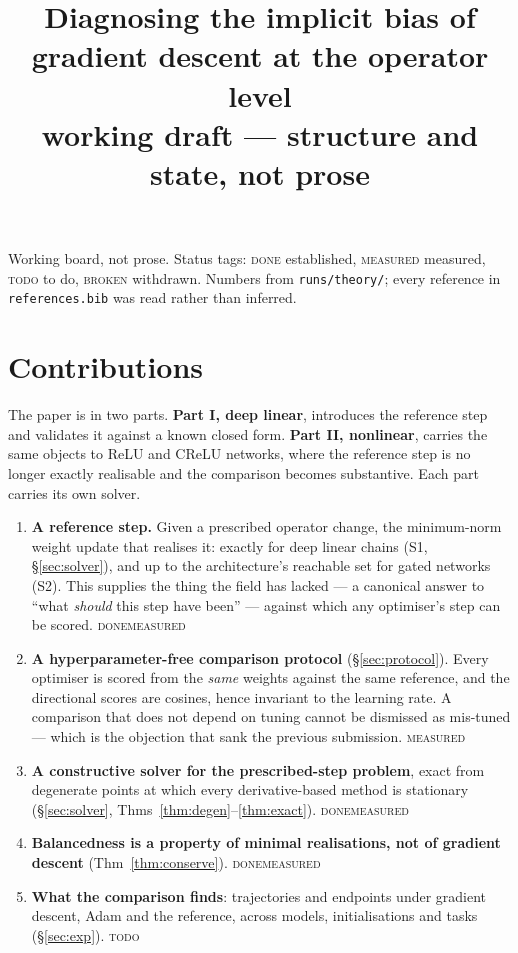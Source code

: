 \documentclass{article}
\title{Diagnosing the implicit bias of gradient descent at the operator level\\{\large working draft --- structure and state, not prose}}
\author{}\date{}
\newcommand{\OK}{{\color{green!50!black}\textsc{done}}}
\newcommand{\RUN}{{\color{blue!70!black}\textsc{measured}}}
\newcommand{\TD}{{\color{orange!85!black}\textsc{todo}}}
\newcommand{\NO}{{\color{red!75!black}\textsc{broken}}}
\newcommand{\NOTE}[1]{{\color{gray}\small #1}}
\theoremstyle{plain}\newtheorem{theorem}{Theorem}\newtheorem{lemma}[theorem]{Lemma}
\theoremstyle{definition}\newtheorem{definition}[theorem]{Definition}
\begin{document}
\maketitle



\NOTE{Working board, not prose. Status tags: \OK{} established, \RUN{} measured, \TD{} to do,
\NO{} withdrawn. Numbers from \texttt{runs/theory/}; every reference in \texttt{references.bib}
was read rather than inferred.}

\section{Contributions}\label{sec:contrib}

\NOTE{The paper is in two parts. \textbf{Part I, deep linear}, introduces the reference step and
validates it against a known closed form. \textbf{Part II, nonlinear}, carries the same objects to
ReLU and CReLU networks, where the reference step is no longer exactly realisable and the
comparison becomes substantive. Each part carries its own solver.}

\begin{enumerate}[label=\textbf{C\arabic*.},leftmargin=*,itemsep=2pt]
  \item \textbf{A reference step.} Given a prescribed operator change, the minimum-norm weight
        update that realises it: exactly for deep linear chains (S1, \S\ref{sec:solver}), and up to
        the architecture's reachable set for gated networks (S2). This supplies the thing the field
        has lacked --- a canonical answer to ``what \emph{should} this step have been'' --- against
        which any optimiser's step can be scored. \OK{}\RUN{}
  \item \textbf{A hyperparameter-free comparison protocol} (\S\ref{sec:protocol}). Every optimiser
        is scored from the \emph{same} weights against the same reference, and the directional
        scores are cosines, hence invariant to the learning rate. A comparison that does not depend
        on tuning cannot be dismissed as mis-tuned --- which is the objection that sank the previous
        submission. \RUN{}
  \item \textbf{A constructive solver for the prescribed-step problem}, exact from degenerate
        points at which every derivative-based method is stationary (\S\ref{sec:solver},
        Thms~\ref{thm:degen}--\ref{thm:exact}). \OK{}\RUN{}
  \item \textbf{Balancedness is a property of minimal realisations, not of gradient descent}
        (Thm~\ref{thm:conserve}). \OK{}\RUN{}
  \item \textbf{What the comparison finds}: trajectories and endpoints under gradient descent,
        Adam and the reference, across models, initialisations and tasks (\S\ref{sec:exp}). \TD{}
\end{enumerate}
\end{document}

